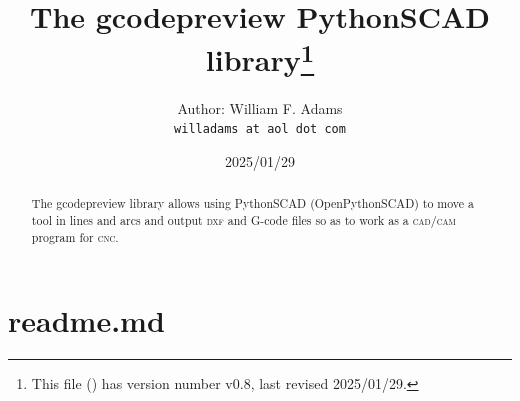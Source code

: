 \documentclass{ltxdoc}
\begin{document}

\def\fileversion{v0.8} \def\filedate{2025/01/29}










\title{The gcodepreview PythonSCAD library\thanks{This
        file (\texttt{\jobname}) has version number \fileversion, last revised
        \filedate.}}

\author{%
Author: William F. Adams\\
\texttt{willadams at aol dot com}
}
\date{\filedate}
\maketitle
\begin{abstract}
\noindent The gcodepreview library allows using PythonSCAD (OpenPythonSCAD) to move a tool in lines and arcs and output \textsc{dxf} and G-code files so as to work as a \textsc{cad}/\allowbreak \textsc{cam} program for \textsc{cnc}.
\end{abstract}
\tableofcontents

\clearpage
\section{readme.md}
\end{document}
